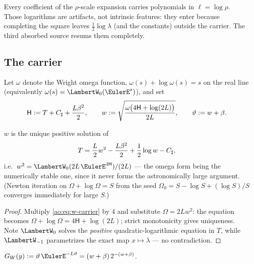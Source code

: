 Every coefficient of the $\rho$-scale expansion carries polynomials in
$\ell=\log\rho$.  Those logarithms are artifacts, not intrinsic
features: they enter because completing the square leaves
$\tfrac12\log\lambda$ (and the constants) outside the carrier.  The
third absorbed source resums them completely.

\subsection{The carrier}

Let $\omega$ denote the Wright omega function,
$\omega(s)+\log\omega(s)=s$ on the real line
(equivalently $\omega(s)=\LambertW_0(\EulerE^{s})$), and set
\begin{equation}
 \mathsf H:=T+C_{\sharp}+\frac{L\beta^{2}}2,
 \qquad
 w:=\sqrt{\frac{\omega\bigl(4\mathsf H+\log(2L)\bigr)}{2L}},
 \qquad
 \vartheta:=w+\beta.
 \label{ao:eq:w-def}
\end{equation}

\begin{proposition}
\label{ao:prop:carrier-equation}
$w$ is the unique positive solution of
\begin{equation}
 T=\frac L2w^{2}-\frac{L\beta^{2}}2+\frac12\log w-C_{\sharp},
 \label{ao:eq:w-carrier}
\end{equation}
i.e.\ $w^{2}=\LambertW_0(2L\,\EulerE^{4\mathsf H})/(2L)$ --- the omega form
being the numerically stable one, since it never forms the
astronomically large argument.  (Newton iteration on
$\Omega+\log\Omega=S$ from the seed $\Omega_0=S-\log S+(\log S)/S$
converges immediately for large $S$.)
\end{proposition}

\begin{proof}
Multiply \eqref{ao:eq:w-carrier} by $4$ and substitute
$\Omega=2Lw^{2}$: the equation becomes
$\Omega+\log\Omega=4\mathsf H+\log(2L)$; strict monotonicity gives
uniqueness.  Note $\LambertW_0$ solves the \emph{positive}
quadratic-logarithmic equation in $T$, while $\LambertW_{-1}$
parametrizes the exact map $x\mapsto\lambda$ --- no contradiction.
\end{proof}

\begin{definition}
$G_W(y):=\vartheta\,\EulerE^{-L\vartheta}
=(w+\beta)\,2^{-(w+\beta)}$.
\end{definition}

